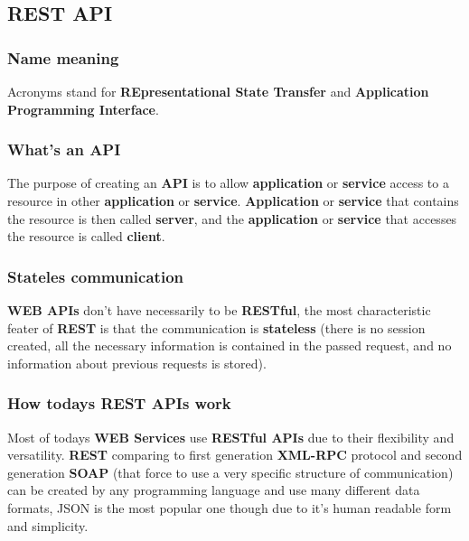 \documentclass[11pt,a4paper]{article}
\begin{document}
\subsection{REST API}

\subsubsection{Name meaning}

Acronyms stand for \textbf{REpresentational State Transfer} and \textbf{Application Programming Interface}.\\

\subsubsection{What's an API}

The purpose of creating an \textbf{API} is to allow \textbf{application} or \textbf{service} access to a resource in other \textbf{application} or \textbf{service}. \textbf{Application} or \textbf{service }that contains the resource is then called \textbf{server}, and the \textbf{application} or \textbf{service} that accesses the resource is called \textbf{client}.\\

\subsubsection{Stateles communication}

\textbf{WEB APIs} don't have necessarily to be \textbf{RESTful}, the most characteristic feater of \textbf{REST} is that the communication is \textbf{stateless} (there is no session created, all the necessary information is contained in the passed request, and no information about previous requests is stored).\\

\subsubsection{How todays REST APIs work}

Most of todays \textbf{WEB Services} use \textbf{RESTful APIs} due to their flexibility and versatility. \textbf{REST} comparing to first generation \textbf{XML-RPC} protocol and second generation \textbf{SOAP} (that force to use a very specific structure of communication)	can be created by any programming language and use many different data formats, JSON is the most popular one though due to it's human readable form and simplicity.\\
\end{document}
